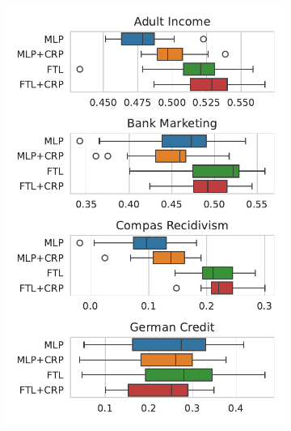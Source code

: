 \begin{figure}[!ht]
\begin{subfigure}{.32\linewidth}
    \includegraphics[width=1\linewidth]{images/boxplot_mcc_odds_crp.pdf}
\end{subfigure}
\end{figure}


